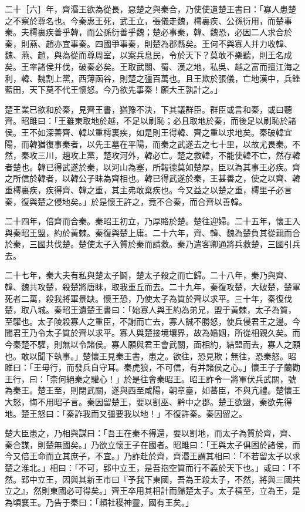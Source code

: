 \begin{pinyinscope}
二十［六］年，齊湣王欲為從長，惡楚之與秦合，乃使使遺楚王書曰：「寡人患楚之不察於尊名也。今秦惠王死，武王立，張儀走魏，樗裏疾、公孫衍用，而楚事秦。夫樗裏疾善乎韓，而公孫衍善乎魏；楚必事秦，韓、魏恐，必因二人求合於秦，則燕、趙亦宜事秦。四國爭事秦，則楚為郡縣矣。王何不與寡人并力收韓、魏、燕、趙，與為從而尊周室，以案兵息民，令於天下？莫敢不樂聽，則王名成矣。王率諸侯并伐，破秦必矣。王取武關、蜀、漢之地，私吳、越之富而擅江海之利，韓、魏割上黨，西薄函谷，則楚之彊百萬也。且王欺於張儀，亡地漢中，兵銼藍田，天下莫不代王懷怒。今乃欲先事秦！願大王孰計之。」

楚王業已欲和於秦，見齊王書，猶豫不決，下其議群臣。群臣或言和秦，或曰聽齊。昭雎曰：「王雖東取地於越，不足以刷恥；必且取地於秦，而後足以刷恥於諸侯。王不如深善齊、韓以重樗裏疾，如是則王得韓、齊之重以求地矣。秦破韓宜陽，而韓猶復事秦者，以先王墓在平陽，而秦之武遂去之七十里，以故尤畏秦。不然，秦攻三川，趙攻上黨，楚攻河外，韓必亡。楚之救韓，不能使韓不亡，然存韓者楚也。韓已得武遂於秦，以河山為塞，所報德莫如楚厚，臣以為其事王必疾。齊之所信於韓者，以韓公子眛為齊相也。韓已得武遂於秦，王甚善之，使之以齊、韓重樗裏疾，疾得齊、韓之重，其主弗敢棄疾也。今又益之以楚之重，樗里子必言秦，復與楚之侵地矣。」於是懷王許之，竟不合秦，而合齊以善韓。

二十四年，倍齊而合秦。秦昭王初立，乃厚賂於楚。楚往迎婦。二十五年，懷王入與秦昭王盟，約於黃棘。秦復與楚上庸。二十六年，齊、韓、魏為楚負其從親而合於秦，三國共伐楚。楚使太子入質於秦而請救。秦乃遣客卿通將兵救楚，三國引兵去。

二十七年，秦大夫有私與楚太子鬬，楚太子殺之而亡歸。二十八年，秦乃與齊、韓、魏共攻楚，殺楚將唐眛，取我重丘而去。二十九年，秦復攻楚，大破楚，楚軍死者二萬，殺我將軍景缺。懷王恐，乃使太子為質於齊以求平。三十年，秦復伐楚，取八城。秦昭王遺楚王書曰：「始寡人與王約為弟兄，盟于黃棘，太子為質，至驩也。太子陵殺寡人之重臣，不謝而亡去，寡人誠不勝怒，使兵侵君王之邊。今聞君王乃令太子質於齊以求平。寡人與楚接境壤界，故為婚姻，所從相親久矣。而今秦楚不驩，則無以令諸侯。寡人願與君王會武關，面相約，結盟而去，寡人之願也。敢以聞下執事。」楚懷王見秦王書，患之。欲往，恐見欺；無往，恐秦怒。昭雎曰：「王毋行，而發兵自守耳。秦虎狼，不可信，有并諸侯之心。」懷王子子蘭勸王行，曰：「柰何絕秦之驩心！」於是往會秦昭王。昭王詐令一將軍伏兵武關，號為秦王。楚王至，則閉武關，遂與西至咸陽，朝章臺，如蕃臣，不與亢禮。楚懷王大怒，悔不用昭子言。秦因留楚王，要以割巫、黔中之郡。楚王欲盟，秦欲先得地。楚王怒曰：「秦詐我而又彊要我以地！」不復許秦。秦因留之。

楚大臣患之，乃相與謀曰：「吾王在秦不得還，要以割地，而太子為質於齊，齊、秦合謀，則楚無國矣。」乃欲立懷王子在國者。昭雎曰：「王與太子俱困於諸侯，而今又倍王命而立其庶子，不宜。」乃詐赴於齊，齊湣王謂其相曰：「不若留太子以求楚之淮北。」相曰：「不可，郢中立王，是吾抱空質而行不義於天下也。」或曰：「不然。郢中立王，因與其新王市曰『予我下東國，吾為王殺太子，不然，將與三國共立之』，然則東國必可得矣。」齊王卒用其相計而歸楚太子。太子橫至，立為王，是為頃襄王。乃告于秦曰：「賴社稷神靈，國有王矣。」


\end{pinyinscope}
